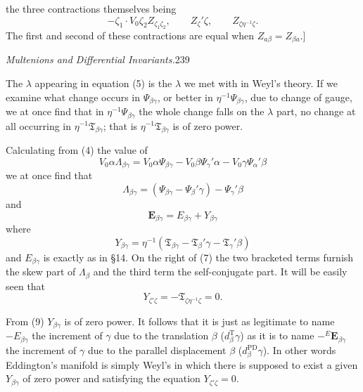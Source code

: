\documentclass[11pt]{article}
\begin{document}
the three contractions themselves being
\[
-\zeta_1\mathbin{\cdot}V_0\zeta_2Z_{\zeta_1\zeta_2},\qquad Z_\zeta'\zeta,\qquad Z_{\zeta\eta^{-1}\zeta}.
\]
The first and second of these contractions are equal when $Z_{a\beta}=Z_{\beta a}$.]
\newpage\thispagestyle{empty}\begin{center}\textit{Multenions and Differential Invariants.}\hfill 239\end{center}
\indent The $\lambda$ appearing in equation (5) is the $\lambda$ we met with in Weyl's theory. If we examine what change occurs in $\Psi_{\beta\gamma}$, or better in $\eta^{-1}\Psi_{\beta\gamma}$, due to change of gauge, we at once find that in $\eta^{-1}\Psi_{\beta\gamma}$ the whole change falls on the $\lambda$ part, no change at all occurring in $\eta^{-1}\mathfrak{T}_{\beta\gamma}$; that is $\eta^{-1}\mathfrak{T}_{\beta\gamma}$ is of zero power.

\indent Calculating from (4) the value of
\[
V_0\alpha\Lambda_{\beta\gamma}=V_0\alpha\Psi_{\beta\gamma}-V_0\beta\Psi_\gamma'\alpha-V_0\gamma\Psi_\alpha'\beta
\]
we at once find that
\begin{equation}\Lambda_{\beta\gamma}=(\Psi_{\beta\gamma}-\Psi_\beta'\gamma)-\Psi_\gamma'\beta\tag{7}\end{equation}
and
\begin{equation}\mathbf{E}_{\beta\gamma}=E_{\beta\gamma}+Y_{\beta\gamma}\tag{8}\end{equation}
where
\begin{equation}Y_{\beta\gamma}=\eta^{-1}(\mathfrak{T}_{\beta\gamma}-\mathfrak{T}_\beta'\gamma-\mathfrak{T}_\gamma'\beta)\tag{9}\end{equation}
and $E_{\beta\gamma}$ is exactly as in \S14. On the right of (7) the two bracketed terms furnish the skew part of $\Lambda_\beta$ and the third term the self-conjugate part. It will be easily seen that
\begin{equation}Y_{\zeta'\zeta}=-\mathfrak{T}_{\zeta\eta^{-1}\zeta}=0.\tag{10}\end{equation}

\indent From (9) $Y_{\beta\gamma}$ is of zero power. It follows that it is just as legitimate to name $-E_{\beta\gamma}$ the increment of $\gamma$ due to the translation $\beta$ ($d_\beta^{\mathrm T}\gamma$) as it is to name $-{}^E\mathbf{E}_{\beta\gamma}$ the increment of $\gamma$ due to the parallel displacement $\beta$ ($d_\beta^{\mathrm{PD}}\gamma$). In other words Eddington's manifold is simply Weyl's in which there is supposed to exist a given $Y_{\beta\gamma}$ of zero power and satisfying the equation $Y_{\zeta'\zeta}=0$.
\end{document}
